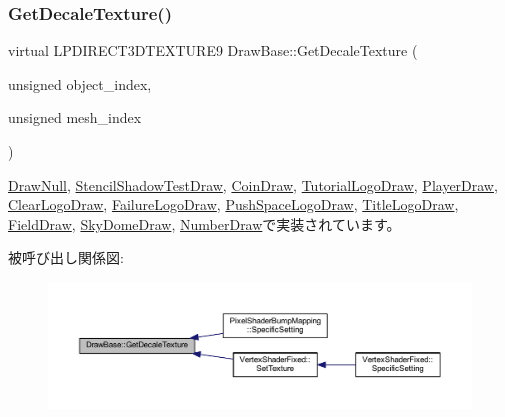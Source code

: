 \subsubsection{\texorpdfstring{Get\+Decale\+Texture()}{GetDecaleTexture()}}
{\footnotesize\ttfamily virtual L\+P\+D\+I\+R\+E\+C\+T3\+D\+T\+E\+X\+T\+U\+R\+E9 Draw\+Base\+::\+Get\+Decale\+Texture (\begin{DoxyParamCaption}\item[{unsigned}]{object\+\_\+index,  }\item[{unsigned}]{mesh\+\_\+index }\end{DoxyParamCaption})\hspace{0.3cm}{\ttfamily [pure virtual]}}



\mbox{\hyperlink{class_draw_null_a8496ed1b1f765a331a8f1704122b8ca4}{Draw\+Null}}, \mbox{\hyperlink{class_stencil_shadow_test_draw_a387a97781f743aa0ea0727c050ef53b2}{Stencil\+Shadow\+Test\+Draw}}, \mbox{\hyperlink{class_coin_draw_a1d4ab1a5c480833b8d8e7fe226136ad5}{Coin\+Draw}}, \mbox{\hyperlink{class_tutorial_logo_draw_ad9df98aa8a5b11872dba6f6609589035}{Tutorial\+Logo\+Draw}}, \mbox{\hyperlink{class_player_draw_a6cecfb28942044efff0b9d6213b511a5}{Player\+Draw}}, \mbox{\hyperlink{class_clear_logo_draw_a04ae25ae9cb59df0d0c346b65baed3f2}{Clear\+Logo\+Draw}}, \mbox{\hyperlink{class_failure_logo_draw_a2a74fafba17b2f63b1c61abd67289afd}{Failure\+Logo\+Draw}}, \mbox{\hyperlink{class_push_space_logo_draw_a4990a9f5662af324f2632e8647cbdde4}{Push\+Space\+Logo\+Draw}}, \mbox{\hyperlink{class_title_logo_draw_ab727012424a02249a90a0f7d247371a8}{Title\+Logo\+Draw}}, \mbox{\hyperlink{class_field_draw_a67eabcc5ffd6697b87e89a1c4ddb95f6}{Field\+Draw}}, \mbox{\hyperlink{class_sky_dome_draw_a1d708782f13648724e423d1dca22b213}{Sky\+Dome\+Draw}}, \mbox{\hyperlink{class_number_draw_ad1d9a4cee49e7bddce51b5c58e739de9}{Number\+Draw}}で実装されています。

被呼び出し関係図\+:\nopagebreak
\begin{figure}[H]
\begin{center}
\leavevmode
\includegraphics[width=350pt]{class_draw_base_a4e36184dbb605bcae13bfb38722ddc24_icgraph}
\end{center}
\end{figure}
\mbox{\label{class_draw_base_a894bf875b80745150b250e584f00fa0c}} 
